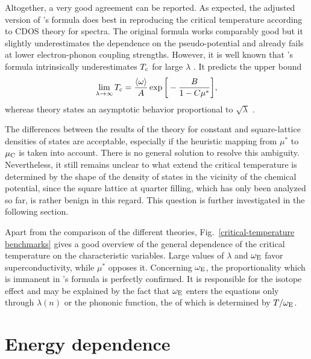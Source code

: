 Altogether, a very good agreement can be reported. As expected, the adjusted
version of 's formula does best in reproducing the critical
temperature according to CDOS  theory for 
spectra. The original formula works comparably good but it slightly
underestimates the dependence on the  pseudo-potential and already
fails at lower electron-phonon coupling strengths. However, it is well known
that 's formula intrinsically underestimates $T \sb{\text{c}}$ for large
$\lambda$ \cite{AllenDynes75}. It predicts the upper bound
%
\begin{equation*}
    \lim_{\lambda \rightarrow \infty} T \sb{\text{c}} = \frac {\langle\omega\rangle} A
    \exp \bigg[ -\frac B {1 - C \mu^*} \bigg],
\end{equation*}
%
whereas  theory states an asymptotic behavior proportional to
$\sqrt \lambda$ \cite[Eq.~3.56]{Galasso05}.

The differences between the results of the  theory for constant
and square-lattice densities of states are acceptable, especially if the
heuristic mapping from $\mu^*$ to $\mu \sb{\text{C}}$ is taken into account. There is
no general solution to resolve this ambiguity. Nevertheless, it still remains
unclear to what extend the critical temperature is determined by the shape of
the density of states in the vicinity of the chemical potential, since the
square lattice at quarter filling, which has only been analyzed so far, is
rather benign in this regard. This question is further investigated in the
following section.

Apart from the comparison of the different theories,
Fig.~\ref{critical-temperature benchmarks} gives a good overview of the general
dependence of the critical temperature on the characteristic variables. Large
values of $\lambda$ and $\omega \sb{\text{E}}$ favor superconductivity, while $\mu^*$
opposes it. Concerning $\omega \sb{\text{E}}$, the proportionality which is immanent in
's formula is perfectly confirmed. It is responsible for the
isotope effect and may be explained by the fact that $\omega \sb{\text{E}}$ enters the
 equations only through $\lambda(n)$ or the phononic
 function, the  of which is determined by $T / \omega
\sb{\text{E}}$.

\section{Energy dependence}

